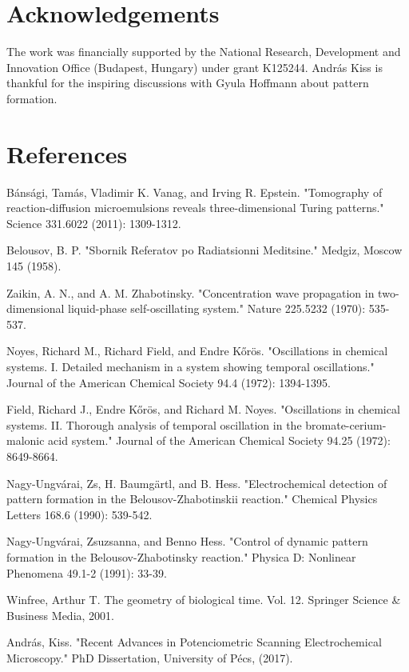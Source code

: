 \documentclass[3p, twocolumn]{elsarticle}
\begin{document}
\section*{Acknowledgements}
The work was financially supported by the National Research, Development and Innovation Office (Budapest, Hungary) under grant K125244.
András Kiss is thankful for the inspiring discussions with Gyula Hoffmann about pattern formation.
\section*{References}

\begin{thebibliography}{5}
Bánsági, Tamás, Vladimir K. Vanag, and Irving R. Epstein. "Tomography of reaction-diffusion microemulsions reveals three-dimensional Turing patterns." Science 331.6022 (2011): 1309-1312.

Belousov, B. P. "Sbornik Referatov po Radiatsionni Meditsine." Medgiz, Moscow 145 (1958).

Zaikin, A. N., and A. M. Zhabotinsky. "Concentration wave propagation in two-dimensional liquid-phase self-oscillating system." Nature 225.5232 (1970): 535-537.

Noyes, Richard M., Richard Field, and Endre Kőrös. "Oscillations in chemical systems. I. Detailed mechanism in a system showing temporal oscillations." Journal of the American Chemical Society 94.4 (1972): 1394-1395.

Field, Richard J., Endre Kőrös, and Richard M. Noyes. "Oscillations in chemical systems. II. Thorough analysis of temporal oscillation in the bromate-cerium-malonic acid system." Journal of the American Chemical Society 94.25 (1972): 8649-8664.


Nagy-Ungvárai, Zs, H. Baumgärtl, and B. Hess. "Electrochemical detection of pattern formation in the Belousov-Zhabotinskii reaction." Chemical Physics Letters 168.6 (1990): 539-542. 

Nagy-Ungvárai, Zsuzsanna, and Benno Hess. "Control of dynamic pattern formation in the Belousov-Zhabotinsky reaction." Physica D: Nonlinear Phenomena 49.1-2 (1991): 33-39.

Winfree, Arthur T. The geometry of biological time. Vol. 12. Springer Science \& Business Media, 2001.

András, Kiss. "Recent Advances in Potenciometric Scanning Electrochemical Microscopy." PhD Dissertation, University of Pécs, (2017).


\end{thebibliography}
\end{document}
